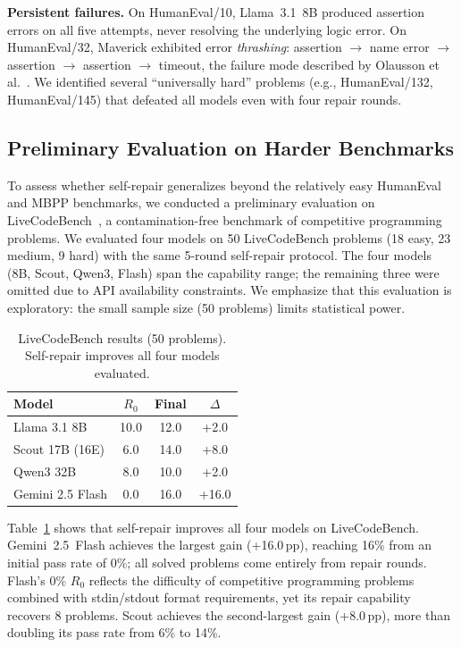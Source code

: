 \documentclass[conference]{IEEEtran}
\begin{document}
\textbf{Persistent failures.} On HumanEval/10, Llama~3.1~8B produced assertion errors on all five attempts, never resolving the underlying logic error. On HumanEval/32, Maverick exhibited error \emph{thrashing}: assertion $\rightarrow$ name error $\rightarrow$ assertion $\rightarrow$ assertion $\rightarrow$ timeout, the failure mode described by Olausson et al.~\cite{olausson2024selfrepair}. We identified several ``universally hard'' problems (e.g., HumanEval/132, HumanEval/145) that defeated all models even with four repair rounds.

\subsection{Preliminary Evaluation on Harder Benchmarks}

To assess whether self-repair generalizes beyond the relatively easy HumanEval and MBPP benchmarks, we conducted a preliminary evaluation on LiveCodeBench~\cite{jain2024livecodebench}, a contamination-free benchmark of competitive programming problems. We evaluated four models on 50 LiveCodeBench problems (18 easy, 23 medium, 9 hard) with the same 5-round self-repair protocol. The four models (8B, Scout, Qwen3, Flash) span the capability range; the remaining three were omitted due to API availability constraints. We emphasize that this evaluation is exploratory: the small sample size (50 problems) limits statistical power.

\begin{table}[t]
\centering
\caption{LiveCodeBench results (50 problems). Self-repair improves all four models evaluated.}
\label{tab:livecodebench}
\begin{tabular}{lccc}
\toprule
\textbf{Model} & $R_0$ & \textbf{Final} & $\Delta$ \\
\midrule
Llama 3.1 8B    & 10.0 & 12.0 & +2.0 \\
Scout 17B (16E) &  6.0 & 14.0 & +8.0 \\
Qwen3 32B       &  8.0 & 10.0 & +2.0 \\
Gemini 2.5 Flash &  0.0 & 16.0 & +16.0 \\
\bottomrule
\end{tabular}
\end{table}

Table~\ref{tab:livecodebench} shows that self-repair improves all four models on LiveCodeBench. Gemini~2.5~Flash achieves the largest gain (+16.0\,pp), reaching 16\% from an initial pass rate of 0\%; all solved problems come entirely from repair rounds. Flash's 0\% $R_0$ reflects the difficulty of competitive programming problems combined with stdin/stdout format requirements, yet its repair capability recovers 8 problems. Scout achieves the second-largest gain (+8.0\,pp), more than doubling its pass rate from 6\% to 14\%.
\end{document}
